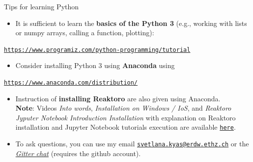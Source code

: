 \begin{frame}{Tips for learning Python}
\begin{itemize}
\item It is sufficient to learn the \alert{\textbf{basics of the Python 3}} (e.g., working with lists or numpy arrays, 
calling a function, plotting):
\end{itemize}
\begin{center}
{\href{https://www.programiz.com/python-programming/tutorial}{\textcolor{indigo(dye)}{\tt https://www.programiz.com/python-programming/tutorial}}}{\large\par}
\par\end{center}
\begin{itemize}
\item Consider installing Python 3 using \alert{\textbf{Anaconda}} using
\end{itemize}
\begin{center}
{\href{https://www.anaconda.com/distribution/}{\textcolor{indigo(dye)}{\tt https://www.anaconda.com/distribution/}}}{\large\par}
\par\end{center}
\begin{itemize}
\item Instruction of \alert{\textbf{installing Reaktoro}} are also given using Anaconda. \\
\textbf{Note}: Videos 
\emph{Into words}, 
\emph{Installation on Windows / IoS}, and 
\emph{Reaktoro Jyputer Notebook Introduction Installation} with explanation on Reaktoro installation and Jupyter Notebook tutorials execution are available  \href{https://polybox.ethz.ch/index.php/s/qStBnxUnry648U5}{\textcolor{indigo(dye)}{\tt here}}. 
%
\item To ask questions, you can use my email \href{svetlana.kyas@erdw.ethz.ch}{\textcolor{indigo(dye)}{\tt svetlana.kyas@erdw.ethz.ch}} or the \href{https://gitter.im/geofluids/community}{\textcolor{indigo(dye)}{\it Gitter chat}} (requires the github account).
\end{itemize}

\end{frame}

%
